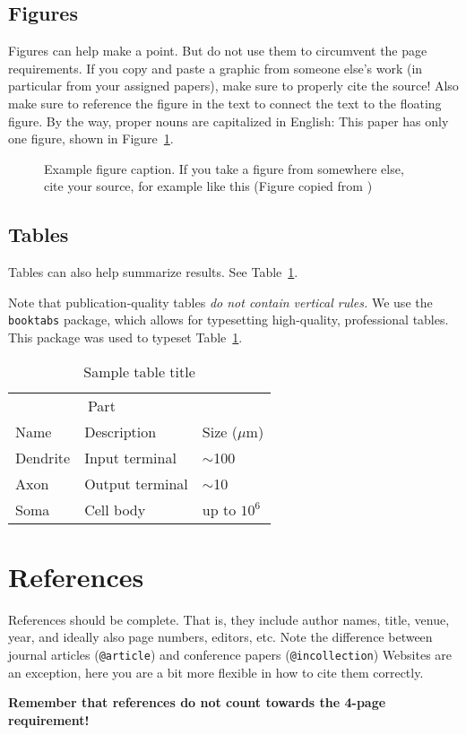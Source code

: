 \documentclass{article}
\begin{document}
\subsection{Figures}

Figures can help make a point. But do not use them to circumvent the page requirements. If you copy and paste a graphic from someone else's work (in particular from your assigned papers), make sure to properly cite the source! Also make sure to reference the figure in the text to connect the text to the floating figure. By the way, proper nouns are capitalized in English: This paper has only one figure, shown in Figure~\ref{fig:1}.

\begin{figure}
  \centering
  \fbox{\rule[-.5cm]{0cm}{4cm} \rule[-.5cm]{4cm}{0cm}}
  \caption{Example figure caption. If you take a figure from somewhere else, cite your source, for example like this (Figure copied from \cite{Berk.2018})}
  \label{fig:1}
\end{figure}

\subsection{Tables}

Tables can also help summarize results. See Table~\ref{sample-table}.

Note that publication-quality tables \emph{do not contain vertical rules.} We use the \verb+booktabs+ package, which allows for
typesetting high-quality, professional tables. This package was used to typeset Table~\ref{sample-table}.

\begin{table}
  \caption{Sample table title}
  \label{sample-table}
  \centering
  \begin{tabular}{lll}
    \toprule
    \multicolumn{2}{c}{Part}                   \\
    \cmidrule(r){1-2}
    Name     & Description     & Size ($\mu$m) \\
    \midrule
    Dendrite & Input terminal  & $\sim$100     \\
    Axon     & Output terminal & $\sim$10      \\
    Soma     & Cell body       & up to $10^6$  \\
    \bottomrule
  \end{tabular}
\end{table}


\newpage
\section*{References}

References should be complete. That is, they include author names, title, venue, year, and ideally also page numbers, editors, etc. Note the difference between journal articles (\verb+@article+) and conference papers (\verb+@incollection+) Websites are an exception, here you are a bit more flexible in how to cite them correctly. 

{\bf Remember that references do not count towards the 4-page requirement!}
\medskip
\small


\end{document}
